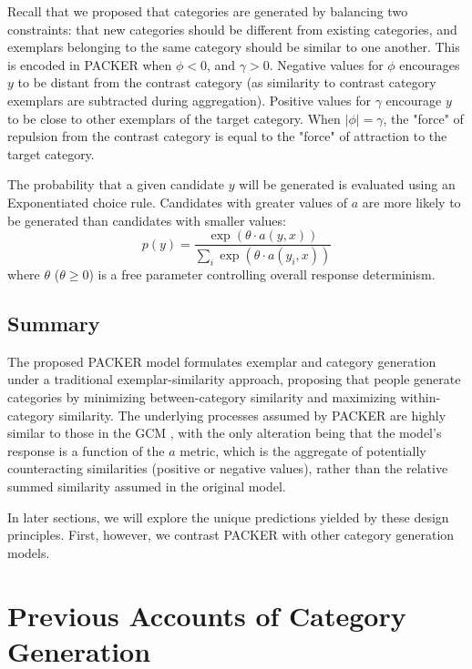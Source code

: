 \documentclass[10pt,letterpaper]{article}
\begin{document}
Recall that we proposed that categories are generated by balancing two constraints: that new categories should be different from existing categories, and exemplars belonging to the same category should be similar to one another. This is encoded in PACKER when $\phi < 0$, and $\gamma > 0$. Negative values for $\phi$ encourages $y$ to be distant from the contrast category (as similarity to contrast category exemplars are subtracted during aggregation). Positive values for $\gamma$ encourage $y$ to be close to other exemplars of the target category. When $|\phi| = \gamma$, the "force" of repulsion from the contrast category is equal to the "force" of attraction to the target category.

The probability that a given candidate $y$ will be generated is evaluated using an Exponentiated \citet{luce1977choice} choice rule. Candidates with greater values of $a$ are more likely to be generated than candidates with smaller values:
\begin{equation}
p(y) = \dfrac
    { \exp( { \theta \cdot a(y, x) } ) }
    { \sum_i{ \exp( { \theta \cdot a(y_i, x) } ) } }
    \label{eq:packer-choice}
\end{equation}
where $\theta$ ($\theta \geq 0$) is a free parameter controlling overall response determinism. 

\subsection{Summary}
The proposed PACKER model formulates exemplar and category generation under a traditional exemplar-similarity approach, proposing that people generate categories by minimizing between-category similarity and maximizing within-category similarity. The underlying processes assumed by PACKER are highly similar to those in the GCM \citep{nosofsky1984choice}, with the only alteration being that the model's response is a function of the $a$ metric, which is the aggregate of potentially counteracting similarities (positive or negative values), rather than the relative summed similarity assumed in the original model. 

In later sections, we will explore the unique predictions yielded by these design principles. First, however, we contrast PACKER with other category generation models. 


\section{Previous Accounts of Category Generation}
\end{document}
